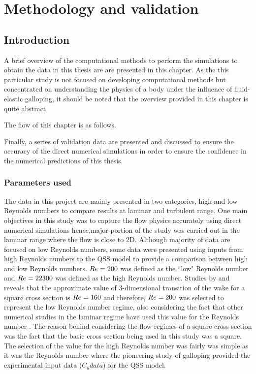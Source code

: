 \chapter{Methodology and validation}

\section{Introduction}
 
A brief overview of the computational methods to perform the simulations to obtain the data in this thesis are are presented in this chapter. As the this particular study is not focused on developing computational methods but concentrated on understanding the physics of a body under the influence of fluid-elastic galloping, it should be noted that the overview provided in this chapter is quite abstract.

The flow of this chapter is as follows.  

Finally, a series of validation data are presented and discussed to ensure the accuracy of the direct numerical simulations in order to ensure the confidence in the numerical predictions of this thesis.


\subsection{Parameters used}

The data in this project are mainly presented in two categories, high and low Reynolds numbers to compare results at laminar and turbulent range. One main objectives in this study was to capture the flow physics accurately using direct numerical simulations hence,major portion of the study was carried out in the laminar range where the flow is close to 2D. Although majority of data are focused on low Reynolds numbers, some data were presented using inputs from high Reynolds numbers to the QSS model to provide a comparison between high and low Reynolds numbers. $Re=200$ was defined as the ``low" Reynolds number and $Re=22300$ was defined as the high Reynolds number. Studies by \citet{tong2008} and \citet{sheard2009} reveals that the approximate value of 3-dimensional transition of the wake for a square cross section is $Re=160$ and therefore, $Re=200$ was selected to represent the low Reynolds number regime, also considering the fact that other numerical studies in the laminar regime have used this value for the Reynolds number \citep{Robertson2003,Joly2012}. The reason behind considering the flow regimes of a square cross section was the fact that the basic cross section being used in this study was a square. The selection of the value for the high Reynolds number was fairly was simple as it was the Reynolds number where the pioneering study of galloping \citet{Parkinson1964} provided the experimental input data ($C_y data$) for the QSS model. 


